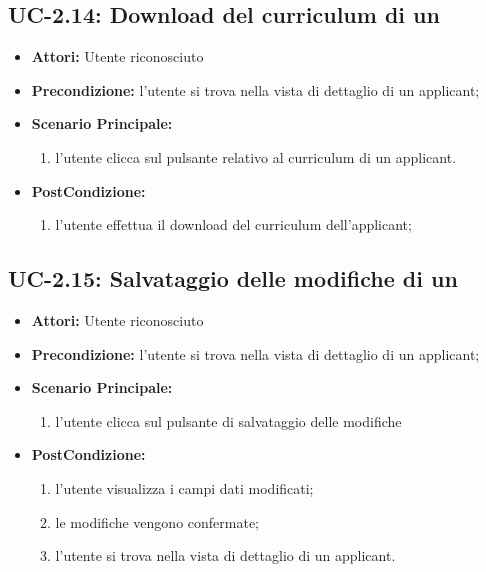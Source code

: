 \subsection{UC-2.14: Download del curriculum di un \applicant}
\begin{itemize}
	\item \textbf{Attori:} Utente riconosciuto
	\item \textbf{Precondizione:}  l'utente si trova nella vista di dettaglio di un applicant;
	\item \textbf{Scenario Principale:}
	\begin{enumerate}
		\item l'utente clicca sul pulsante relativo al curriculum di un applicant.
	\end{enumerate}
	\item \textbf{PostCondizione:} 
	\begin{enumerate}
		\item l'utente effettua il download del curriculum dell'applicant;
	\end{enumerate}
	
\end{itemize}

\subsection{UC-2.15: Salvataggio delle modifiche di un \applicant}
\begin{itemize}
	\item \textbf{Attori:} Utente riconosciuto
	\item \textbf{Precondizione:}  l'utente si trova nella vista di dettaglio di un applicant;
	\item \textbf{Scenario Principale:}
	\begin{enumerate}
		\item l'utente clicca sul pulsante di salvataggio delle modifiche
	\end{enumerate}
	\item \textbf{PostCondizione:} 
	\begin{enumerate}
		\item l'utente visualizza i campi dati modificati;
		\item le modifiche vengono confermate;
		\item l'utente si trova nella vista di dettaglio di un applicant.
	\end{enumerate}
	
\end{itemize}


